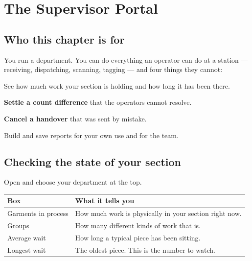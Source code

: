 \chapter{The Supervisor Portal}
\label{ch:supervisor}


\section{Who this chapter is for}

You run a department. You can do everything an operator can do at a station ---
receiving, dispatching, scanning, tagging --- and four things they cannot:

\begin{bullets}
  \item See how much work your section is holding and how long it has been there.
  \item \textbf{Settle a count difference} that the operators cannot resolve.
  \item \textbf{Cancel a handover} that was sent by mistake.
  \item Build and save reports for your own use and for the team.
\end{bullets}

\section{Checking the state of your section}

Open  and choose your department at the top.


\begin{table}[H]
\centering
\small
\begin{tabular}{@{}p{32mm}p{106mm}@{}}
\toprule
\textbf{Box} & \textbf{What it tells you} \\
\midrule
Garments in process & How much work is physically in your section right now. \\
Groups              & How many different kinds of work that is. \\
Average wait        & How long a typical piece has been sitting. \\
Longest wait        & The oldest piece. This is the number to watch. \\
\bottomrule
\end{tabular}
\end{table}

